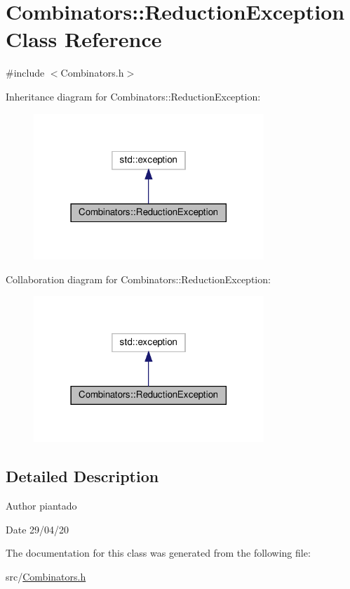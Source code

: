 \hypertarget{class_combinators_1_1_reduction_exception}{}\section{Combinators\+:\+:Reduction\+Exception Class Reference}
\label{class_combinators_1_1_reduction_exception}


{\ttfamily \#include $<$Combinators.\+h$>$}



Inheritance diagram for Combinators\+:\+:Reduction\+Exception\+:\nopagebreak
\begin{figure}[H]
\begin{center}
\leavevmode
\includegraphics[width=246pt]{class_combinators_1_1_reduction_exception__inherit__graph}
\end{center}
\end{figure}


Collaboration diagram for Combinators\+:\+:Reduction\+Exception\+:\nopagebreak
\begin{figure}[H]
\begin{center}
\leavevmode
\includegraphics[width=246pt]{class_combinators_1_1_reduction_exception__coll__graph}
\end{center}
\end{figure}


\subsection{Detailed Description}
\begin{DoxyAuthor}{Author}
piantado 
\end{DoxyAuthor}
\begin{DoxyDate}{Date}
29/04/20 
\end{DoxyDate}


The documentation for this class was generated from the following file\+:\begin{DoxyCompactItemize}
\item 
src/\hyperlink{_combinators_8h}{Combinators.\+h}\end{DoxyCompactItemize}
